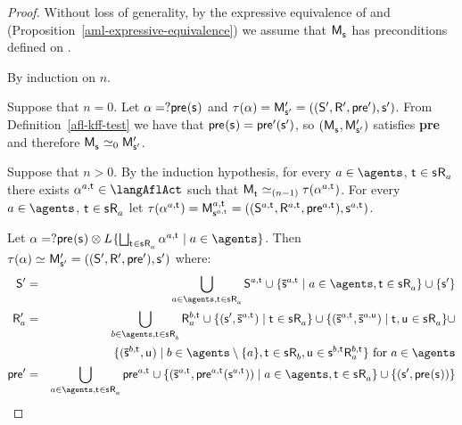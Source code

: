 \begin{proof}
Without loss of generality, by the expressive equivalence of \logicAmlKFF{} and \logicKFF{} (Proposition~\ref{aml-expressive-equivalence}) we assume that $\aPModel{\aStateS}$ has preconditions defined on \langMl{}.

By induction on $n$.

Suppose that $n = 0$. 
Let $\alpha = \test{\aPrecondition(\aStateS)}$ and $\tau(\alpha) = \aPModelP{\aStateSP} = \aPModelTupleP{\aStateSP}$.
From Definition~\ref{afl-kff-test} we have that $\aPrecondition(\aStateS) = \aPreconditionP(\aStateSP)$, so $(\aPModel{\aStateS}, \aPModelP{\aStateSP})$ satisfies {\bf pre} and therefore $\aPModel{\aStateS} \bisimilar[0] \aPModelP{\aStateSP}$.

Suppose that $n > 0$. 
By the induction hypothesis, for every $\agentA \in \agents$, $\aStateT \in \aStateS \aAccessibility{\agentA}$ there exists $\alpha^{\agentA,\aStateT} \in \langAflAct$ such that $\aPModel{\aStateT} \bisimilar[(n - 1)] \tau(\alpha^{\agentA,\aStateT})$.
For every $\agentA \in \agents$, $\aStateT \in \aStateS \aAccessibility{\agentA}$ let $\tau(\alpha^{\agentA,\aStateT}) = \aPModel[\agentA,\aStateT]{\aStateS[\agentA,\aStateT]} = \aPModelTuple[\agentA,\aStateT]{\aStateS[\agentA,\aStateT]}$.

Let $\alpha = \test{\aPrecondition(\aStateS)} \compose \learns \{\bigchoice_{\aStateT \in \aStateS \aAccessibility{\agentA}} \alpha^{\agentA,\aStateT} \mid \agentA \in \agents\}$. 
Then $\tau(\alpha) \bisimilar \aPModelP{\aStateSP} = \aPModelTupleP{\aStateSP}$ where:
\begin{eqnarray*}
    \aStatesP &=& \bigcup_{\agentA \in \agents, \aStateT \in \aStateS \aAccessibility{\agentA}} \aStates[\agentA,\aStateT] \cup \{\aPStateS[\agentA,\aStateT] \mid \agentA \in \agents, \aStateT \in \aStateS \aAccessibility{\agentA}\} \cup \{\aStateSP\}\\
    \aAccessibilityP{\agentA} &=& \bigcup_{\agentB \in \agents, \aStateT \in \aStateS \aAccessibility{\agentB}} \aAccessibility[\agentB,\aStateT]{\agentA} \cup \{(\aStateSP, \aPStateS[\agentA, \aStateT]) \mid \aStateT \in \aStateS \aAccessibility{\agentA}\} \cup \{(\aPStateS[\agentA, \aStateT], \aPStateS[\agentA, \aStateU]) \mid \aStateT, \aStateU \in \aStateS \aAccessibility{\agentA}\} \cup\\
                                               &&\hspace{45pt}\{(\aPStateS[\agentB, \aStateT], \aStateU) \mid \agentB \in \agents \setminus \{\agentA\}, \aStateT \in \aStateS \aAccessibility{\agentB}, \aStateU \in \aStateS[\agentB,\aStateT] \aAccessibility[\agentB,\aStateT]{\agentA}\} \text{ for } \agentA \in \agents\\
    \aPreconditionP &=& \bigcup_{\agentA \in \agents, \aStateT \in \aStateS \aAccessibility{\agentA}} \aPrecondition[\agentA,\aStateT] \cup \{(\aPStateS[\agentA, \aStateT], \aPrecondition[\agentA,\aStateT](\aStateS[\agentA,\aStateT])) \mid \agentA \in \agents, \aStateT \in \aStateS \aAccessibility{\agentA}\} \cup \{(\aStateSP, \aPrecondition(\aStateS))\}
\end{eqnarray*}


\end{proof}
